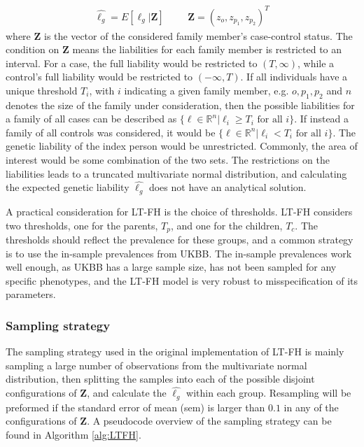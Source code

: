 \begin{align*}
\hat{\ell_g} = E\left[ \ell_g | \mathbf{Z} \right] & & & \mathbf{Z} = \left(z_o, z_{p_1}, z_{p_2} \right)^T
\end{align*}
where $ \mathbf{Z} $ is the vector of the considered family member's case-control status. The condition on $ \mathbf{Z} $ means the liabilities for each family member is restricted to an interval. For a case, the full liability would be restricted to $ (T, \infty) $, while a control's full liability would be restricted to $ (-\infty, T) $. If all individuals have a unique threshold $ T_i $, with $ i $ indicating a given family member, e.g. $ o, p_1, p_2 $ and $ n $ denotes the size of the family under consideration, then the possible liabilities for a family of all cases can be described as $ \{ \ell \in \mathbb{R}^n | \ell_i \geq T_i \text{ for all } i\} $. If instead a family of all controls was considered, it would be $ \{ \ell \in \mathbb{R}^n | \ell_i < T_i \text{ for all } i\} $. The genetic liability of the index person would be unrestricted. Commonly, the area of interest would be some combination of the two sets. The restrictions on the liabilities leads to a truncated multivariate normal distribution, and calculating the expected genetic liability $ \hat{\ell_g} $ does not have an analytical solution. 

A practical consideration for LT-FH is the choice of thresholds. LT-FH considers two thresholds, one for the parents, $ T_p $, and one for the children, $ T_c $. The thresholds should reflect the prevalence for these groups, and a common strategy is to use the in-sample prevalences from UKBB. The in-sample prevalences work well enough, as UKBB has a large sample size, has not been sampled for any specific phenotypes, and the LT-FH model is very robust to misspecification of its parameters.

\subsubsection{Sampling strategy}

The sampling strategy used in the original implementation of LT-FH is mainly sampling a large number of observations from the multivariate normal distribution, then splitting the samples into each of the possible disjoint configurations of $ \mathbf{Z} $, and calculate the $ \hat{\ell_g} $ within each group. Resampling will be preformed if the standard error of mean (sem) is larger than $ 0.1 $ in any of the configurations of $ \mathbf{Z} $. A pseudocode overview of the sampling strategy can be found in Algorithm \ref{alg:LTFH}.


